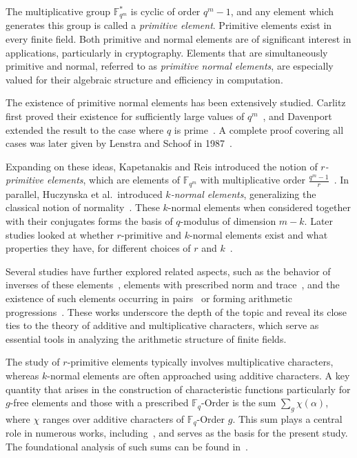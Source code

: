 \documentclass[12pt,a4paper]{article}
\theoremstyle{plain}
\theoremstyle{definition}
\numberwithin{equation}{section}
\begin{document}
    The multiplicative group $\mathbb{F}_{q^m}^*$ is cyclic of order $q^m - 1$, and any element which generates this group is called a \emph{primitive element}. Primitive elements exist in every finite field. Both primitive and normal elements are of significant interest in applications, particularly in cryptography. Elements that are simultaneously primitive and normal, referred to as \emph{primitive normal elements}, are especially valued for their algebraic structure and efficiency in computation.

    The existence of primitive normal elements has been extensively studied. Carlitz first proved their existence for sufficiently large values of $q^m$~\cite{Carlitz1952Prim,CarlitzPrimitiveRootssomeproblem}, and Davenport extended the result to the case where $q$ is prime~\cite{Davenport_existance}. A complete proof covering all cases was later given by Lenstra and Schoof in 1987~\cite{LenstraPriminormal}.

    Expanding on these ideas, Kapetanakis and Reis introduced the notion of \emph{$r$-primitive elements}, which are elements of $\mathbb{F}_{q^m}$ with multiplicative order $\frac{q^m - 1}{r}$~\cite{Reis2019Variation}. In parallel, Huczynska et al.\ introduced \emph{$k$-normal elements}, generalizing the classical notion of normality~\cite{Mullen2013Existance}. These $k$-normal elements when considered together with their conjugates forms the basis of $q$-modulus of dimension $m-k$. Later studies looked at whether $r$-primitive and $k$-normal elements exist and what properties they have, for different choices of $r$ and $k$~\cite{Lucas2,Neumann}.


    Several studies have further explored related aspects, such as the behavior of inverses of these elements~\cite{RANI2_inverse}, elements with prescribed norm and trace~\cite{RANI1_norm&trace}, and the existence of such elements occurring in pairs~\cite{Aguirre2_pairs_rk} or forming arithmetic progressions~\cite{Aguirre3_AP_rk,Laishram_AP}. These works underscore the depth of the topic and reveal its close ties to the theory of additive and multiplicative characters, which serve as essential tools in analyzing the arithmetic structure of finite fields.


    The study of $r$-primitive elements typically involves multiplicative characters, whereas $k$-normal elements are often approached using additive characters. A key quantity that arises in the construction of characteristic functions particularly for $g$-free elements and those with a prescribed $\mathbb{F}_q$-Order is the sum $\displaystyle \sum_g \chi(\alpha)$, where $\chi$ ranges over additive characters of $\mathbb{F}_q$-Order $g$. This sum plays a central role in numerous works, including~\cite{Mullen2013Existance, Reis2019Variation, RANI2_inverse, Aguirre2_pairs_rk, RANI1_norm&trace}, and serves as the basis for the present study. The foundational analysis of such sums can be found in~\cite{Carlitz1954Sum}.
\end{document}
